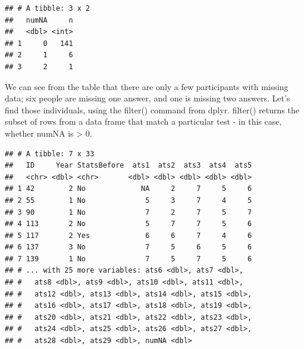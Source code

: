 \documentclass[12pt,]{book}
\newenvironment{Shaded}{\begin{snugshade}}{\end{snugshade}}
\newcommand{\CommentTok}[1]{\textcolor[rgb]{0.56,0.35,0.01}{\textit{#1}}}
\newcommand{\DataTypeTok}[1]{\textcolor[rgb]{0.13,0.29,0.53}{#1}}
\newcommand{\DecValTok}[1]{\textcolor[rgb]{0.00,0.00,0.81}{#1}}
\newcommand{\KeywordTok}[1]{\textcolor[rgb]{0.13,0.29,0.53}{\textbf{#1}}}
\newcommand{\NormalTok}[1]{#1}
\newcommand{\OperatorTok}[1]{\textcolor[rgb]{0.81,0.36,0.00}{\textbf{#1}}}
\newcommand{\StringTok}[1]{\textcolor[rgb]{0.31,0.60,0.02}{#1}}
\begin{document}
\begin{Shaded}
\end{Shaded}

\begin{verbatim}
## # A tibble: 3 x 2
##   numNA     n
##   <dbl> <int>
## 1     0   141
## 2     1     6
## 3     2     1
\end{verbatim}

We can see from the table that there are only a few participants with missing data; six people are missing one answer, and one is missing two answers. Let's find those individuals, using the filter() command from dplyr. filter() returns the subset of rows from a data frame that match a particular test - in this case, whether numNA is \textgreater{} 0.

\begin{Shaded}
\end{Shaded}

\begin{verbatim}
## # A tibble: 7 x 33
##   ID     Year StatsBefore  ats1  ats2  ats3  ats4  ats5
##   <chr> <dbl> <chr>       <dbl> <dbl> <dbl> <dbl> <dbl>
## 1 42        2 No             NA     2     7     5     6
## 2 55        1 No              5     3     7     4     5
## 3 90        1 No              7     2     7     5     7
## 4 113       2 No              5     7     7     5     6
## 5 117       2 Yes             6     6     7     4     6
## 6 137       3 No              7     5     6     5     6
## 7 139       1 No              7     5     7     5     6
## # ... with 25 more variables: ats6 <dbl>, ats7 <dbl>,
## #   ats8 <dbl>, ats9 <dbl>, ats10 <dbl>, ats11 <dbl>,
## #   ats12 <dbl>, ats13 <dbl>, ats14 <dbl>, ats15 <dbl>,
## #   ats16 <dbl>, ats17 <dbl>, ats18 <dbl>, ats19 <dbl>,
## #   ats20 <dbl>, ats21 <dbl>, ats22 <dbl>, ats23 <dbl>,
## #   ats24 <dbl>, ats25 <dbl>, ats26 <dbl>, ats27 <dbl>,
## #   ats28 <dbl>, ats29 <dbl>, numNA <dbl>
\end{verbatim}
\end{document}
